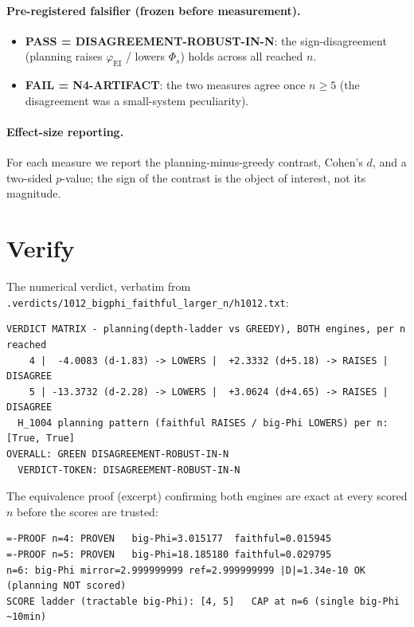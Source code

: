 \documentclass[11pt,a4paper]{article}
\newcommand{\faithful}{\ensuremath{\varphi_{\mathrm{EI}}}}
\newcommand{\bigphi}{\ensuremath{\Phi_{s}}}
\begin{document}
\paragraph{Pre-registered falsifier (frozen before measurement).}
\begin{itemize}\itemsep0.2em
\item \textbf{PASS = DISAGREEMENT-ROBUST-IN-N}: the sign-disagreement (planning
raises \faithful{} / lowers \bigphi{}) holds across all reached $n$.
\item \textbf{FAIL = N4-ARTIFACT}: the two measures agree once $n\ge 5$ (the
disagreement was a small-system peculiarity).
\end{itemize}

\paragraph{Effect-size reporting.} For each measure we report the
planning-minus-greedy contrast, Cohen's $d$, and a two-sided $p$-value; the
sign of the contrast is the object of interest, not its magnitude.

\section{Verify}
\label{sec:verify}

The numerical verdict, verbatim from
\texttt{.verdicts/1012\_bigphi\_faithful\_larger\_n/h1012.txt}:

\begin{lstlisting}[basicstyle=\ttfamily\footnotesize,frame=single,xleftmargin=0pt,breaklines=true]
VERDICT MATRIX - planning(depth-ladder vs GREEDY), BOTH engines, per n reached
    4 |  -4.0083 (d-1.83) -> LOWERS |  +2.3332 (d+5.18) -> RAISES | DISAGREE
    5 | -13.3732 (d-2.28) -> LOWERS |  +3.0624 (d+4.65) -> RAISES | DISAGREE
  H_1004 planning pattern (faithful RAISES / big-Phi LOWERS) per n: [True, True]
OVERALL: GREEN DISAGREEMENT-ROBUST-IN-N
  VERDICT-TOKEN: DISAGREEMENT-ROBUST-IN-N
\end{lstlisting}

The equivalence proof (excerpt) confirming both engines are exact at every
scored $n$ before the scores are trusted:

\begin{lstlisting}[basicstyle=\ttfamily\footnotesize,frame=single,xleftmargin=0pt,breaklines=true]
=-PROOF n=4: PROVEN   big-Phi=3.015177  faithful=0.015945
=-PROOF n=5: PROVEN   big-Phi=18.185180 faithful=0.029795
n=6: big-Phi mirror=2.999999999 ref=2.999999999 |D|=1.34e-10 OK (planning NOT scored)
SCORE ladder (tractable big-Phi): [4, 5]   CAP at n=6 (single big-Phi ~10min)
\end{lstlisting}
\end{document}
